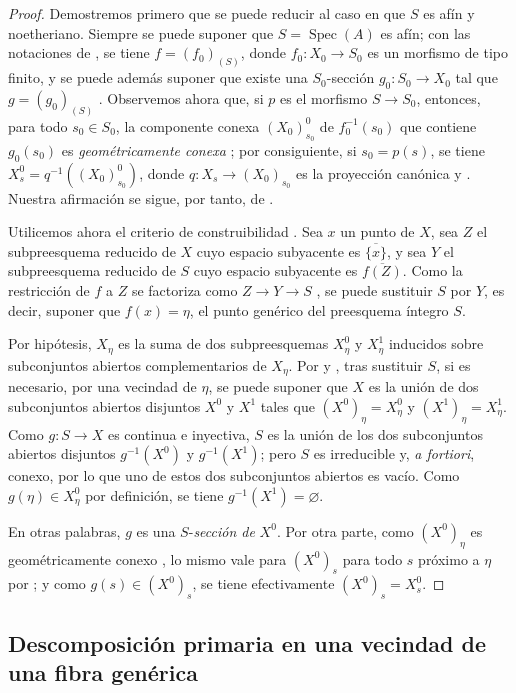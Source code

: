 \begin{proof}
Demostremos primero que se puede reducir al caso en que $S$ es afín y noetheriano. Siempre se puede suponer que $S=\operatorname{Spec}(A)$ es afín; con las notaciones de , se tiene $f=(f_0)_{(S)}$, donde $f_0:X_0\to S_0$ es un morfismo de tipo finito, y se puede además suponer que existe una $S_0$-sección $g_0:S_0\to X_0$ tal que $g=(g_0)_{(S)}$ . Observemos ahora que, si $p$ es el morfismo $S\to S_0$, entonces, para todo $s_0\in S_0$, la componente conexa $(X_0)^0_{s_0}$ de $f_0^{-1}(s_0)$ que contiene $g_0(s_0)$ es \emph{geométricamente conexa} ; por consiguiente, si $s_0=p(s)$, se tiene $X_s^0=q^{-1}((X_0)^0_{s_0})$, donde $q:X_s\to(X_0)_{s_0}$ es la proyección canónica  y . Nuestra afirmación se sigue, por tanto, de .

Utilicemos ahora el criterio de construibilidad . Sea $x$ un punto de $X$, sea $Z$ el subpreesquema reducido de $X$ cuyo espacio subyacente es $\overline{\{x\}}$, y sea $Y$ el subpreesquema reducido de $S$ cuyo espacio subyacente es $\overline{f(Z)}$. Como la restricción de $f$ a $Z$ se factoriza como $Z\to Y\to S$ , se puede sustituir $S$ por $Y$, es decir, suponer que $f(x)=\eta$, el punto genérico del preesquema íntegro $S$.

Por hipótesis, $X_\eta$ es la suma de dos subpreesquemas $X_\eta^0$ y $X_\eta^1$ inducidos sobre subconjuntos abiertos complementarios de $X_\eta$. Por  y , tras sustituir $S$, si es necesario, por una vecindad de $\eta$, se puede suponer que $X$ es la unión de dos subconjuntos abiertos disjuntos $X^0$ y $X^1$ tales que $(X^0)_\eta=X_\eta^0$ y $(X^1)_\eta=X_\eta^1$. Como $g:S\to X$ es continua e inyectiva, $S$ es la unión de los dos subconjuntos abiertos disjuntos $g^{-1}(X^0)$ y $g^{-1}(X^1)$; pero $S$ es irreducible y, \emph{a fortiori}, conexo, por lo que uno de estos dos subconjuntos abiertos es vacío. Como $g(\eta)\in X_\eta^0$ por definición, se tiene $g^{-1}(X^1)=\varnothing$.

En otras palabras, $g$ es una $S$-\emph{sección de} $X^0$. Por otra parte, como $(X^0)_\eta$ es geométricamente conexo , lo mismo vale para $(X^0)_s$ para todo $s$ próximo a $\eta$ por ; y como $g(s)\in(X^0)_s$, se tiene efectivamente $(X^0)_s=X_s^0$.
\end{proof}

\subsection{Descomposición primaria en una vecindad de una fibra genérica}
\label{subsection:IV.9.8}
\label{IV.9.8}

